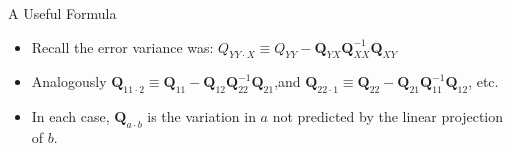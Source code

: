 \documentclass[aspectratio=169, handout, t]{beamer}
\numberwithin{equation}{section}
\begin{document}
\begin{frame}{A Useful Formula}
\begin{itemize}
\item Recall the error variance was: $Q_{YY\cdot X}\equiv Q_{YY}-\bm{Q}_{YX}\bm{Q}^{-1}_{XX}\bm{Q}_{XY}$
\item Analogously $\mathbf{Q}_{11\cdot 2}\equiv \mathbf{Q}_{11}-\bm{Q}_{12}\bm{Q}^{-1}_{22}\bm{Q}_{21}$,and $\mathbf{Q}_{22\cdot 1}\equiv \mathbf{Q}_{22}-\bm{Q}_{21}\bm{Q}^{-1}_{11}\bm{Q}_{12}$, etc.
\item In each case, $\mathbf{Q}_{a\cdot b}$ is the variation in $a$ not predicted by the linear projection of $b$.
\end{itemize}
\end{frame}

%
\end{document}
